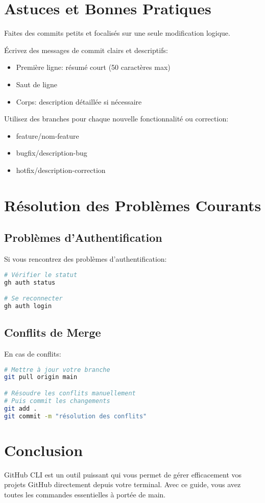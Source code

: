 \documentclass[11pt,a4paper]{article}
\begin{document}
\section{Astuces et Bonnes Pratiques}
\begin{tcolorbox}[title=Conseil 1: Commits Atomiques]
Faites des commits petits et focalisés sur une seule modification logique.
\end{tcolorbox}

\begin{tcolorbox}[title=Conseil 2: Messages de Commit]
Écrivez des messages de commit clairs et descriptifs:
\begin{itemize}
    \item Première ligne: résumé court (50 caractères max)
    \item Saut de ligne
    \item Corps: description détaillée si nécessaire
\end{itemize}
\end{tcolorbox}

\begin{tcolorbox}[title=Conseil 3: Branches]
Utilisez des branches pour chaque nouvelle fonctionnalité ou correction:
\begin{itemize}
    \item feature/nom-feature
    \item bugfix/description-bug
    \item hotfix/description-correction
\end{itemize}
\end{tcolorbox}

\section{Résolution des Problèmes Courants}
\subsection{Problèmes d'Authentification}
Si vous rencontrez des problèmes d'authentification:
\begin{lstlisting}[language=bash]
# Vérifier le statut
gh auth status

# Se reconnecter
gh auth login
\end{lstlisting}

\subsection{Conflits de Merge}
En cas de conflits:
\begin{lstlisting}[language=bash]
# Mettre à jour votre branche
git pull origin main

# Résoudre les conflits manuellement
# Puis commit les changements
git add .
git commit -m "résolution des conflits"
\end{lstlisting}

\section{Conclusion}
GitHub CLI est un outil puissant qui vous permet de gérer efficacement vos projets GitHub directement depuis votre terminal. Avec ce guide, vous avez toutes les commandes essentielles à portée de main.
\end{document}

